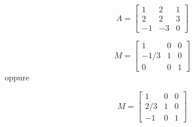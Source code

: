 \[
A=\left[
\begin{array}{ccc}
1 & 2 & 1 \\
2 & 2 & 3\\
-1 & -3 & 0
\end{array}\right]
\]
\bigskip

\[ 
M=\left[
\begin{array}{ccc}
  1 & 0 & 0 \\
  -1/3 & 1 & 0 \\
  0 & 0 & 1
\end{array}
\right] 
\] 
\noindent oppure
\bigskip

\[ 
M=\left[
\begin{array}{ccc}
  1 & 0 & 0 \\
  2/3 & 1 & 0 \\
  -1 & 0 & 1
\end{array}
\right]
\]

